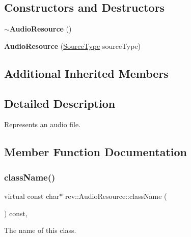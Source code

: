 \subsection*{Constructors and Destructors}
\begin{DoxyCompactItemize}
\item 
\mbox{\label{classrev_1_1_audio_resource_a2a8e855b1354f025428591912c6235d9}} 
{\bfseries $\sim$\+Audio\+Resource} ()
\item 
\mbox{\label{classrev_1_1_audio_resource_ad8487f3a2b5df40487ee17722cb9a52c}} 
{\bfseries Audio\+Resource} (\mbox{\hyperlink{classrev_1_1_audio_resource_a0793d33db36716e1ba7b283b6ded8707}{Source\+Type}} source\+Type)
\end{DoxyCompactItemize}
\subsection*{Additional Inherited Members}


\subsection{Detailed Description}
Represents an audio file. 

\subsection{Member Function Documentation}
\mbox{\label{classrev_1_1_audio_resource_aef383525478a6a648fbddc068941dbea}} 
\subsubsection{\texorpdfstring{className()}{className()}}
{\footnotesize\ttfamily virtual const char$\ast$ rev\+::\+Audio\+Resource\+::class\+Name (\begin{DoxyParamCaption}{ }\end{DoxyParamCaption}) const\hspace{0.3cm}{\ttfamily [inline]}, {\ttfamily [virtual]}}



The name of this class. 

